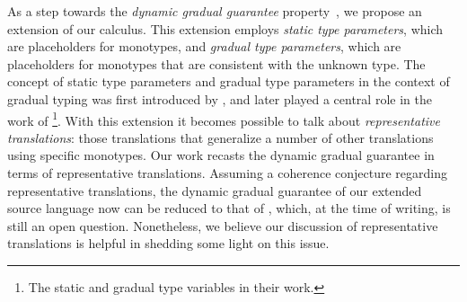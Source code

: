 As a step towards the \emph{dynamic gradual
  guarantee} property~\citep{siek2015refined}, we propose an extension of our
calculus. This extension employs \emph{static type parameters},
which are placeholders for monotypes, and \emph{gradual type
  parameters}, which are placeholders for monotypes that are
consistent with the unknown type. The concept of static type
parameters and gradual type parameters in the context of gradual
typing was first introduced by \citet{garcia2015principal}, and later
played a central role in the work of \citet{yuu2017poly}\footnote{The
  static and gradual type variables in their work.}. With this
extension it becomes possible to talk about \emph{representative
  translations}: those translations that generalize a number of other
translations using specific monotypes. Our work recasts the dynamic gradual guarantee in terms of
representative translations. Assuming a coherence conjecture regarding
representative translations, the dynamic gradual guarantee of our
extended source
language now can be reduced to that of \pbc, which, at the time of writing, is
still an open question. Nonetheless, we believe our discussion of
representative translations is helpful in shedding some light on this issue.

